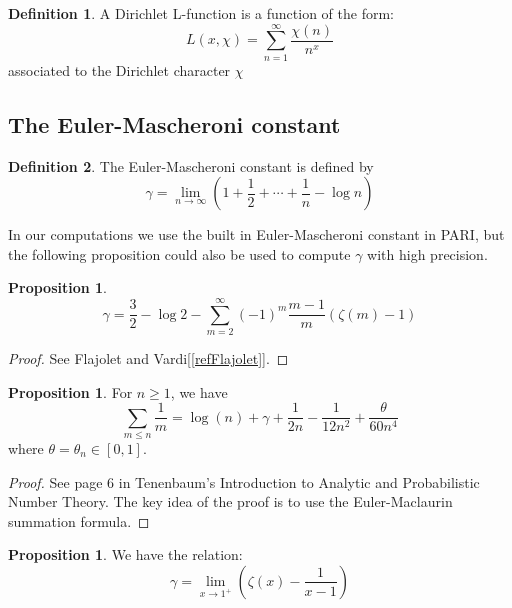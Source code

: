 \documentclass{article}
\theoremstyle{definition}
\newtheorem{definition}{Definition}[section]
\newtheorem{proposition}[theorem]{Proposition}
\theoremstyle{remark}
\begin{document}
\begin{definition}
A Dirichlet L-function is a function of the form:
$$L(x,\chi) = \sum_{n=1}^{\infty}\frac{\chi(n)}{n^x}$$
associated to the Dirichlet character $\chi$
\end{definition}

\subsection{The Euler-Mascheroni constant}
\begin{definition}
The Euler-Mascheroni constant is defined by
$$\gamma = \lim_{n \rightarrow \infty} \left( 1 + \frac{1}{2} + \cdots + \frac{1}{n} - \log n \right)$$
\end{definition}
In our computations we use the built in Euler-Mascheroni constant in PARI, but the following proposition could also be used to compute $\gamma$ with high precision.
\begin{proposition}
$$\gamma = \frac{3}{2}-\log2-\sum_{m=2}^{\infty}(-1)^m\frac{m-1}{m}(\zeta(m)-1) $$
\end{proposition}
\begin{proof}
See Flajolet and Vardi[\ref{refFlajolet}].
\end{proof}
\begin{proposition}\label{Tenenbaum 0.5}
For $n \geq 1$, we have
$$\sum_{m\leq n}\frac{1}{m}= \log(n) + \gamma + \frac{1}{2n}-\frac{1}{12n^2}+\frac{\theta}{60n^4}$$
where $\theta=\theta_n \in [0,1]$.
\end{proposition}
\begin{proof}
See page 6 in Tenenbaum's Introduction to Analytic and Probabilistic Number Theory. The key idea of the proof is to use the Euler-Maclaurin summation formula.
\end{proof}

\begin{proposition}\label{gammaSondow}
We have the relation:
$$\gamma = \lim_{x \rightarrow 1^+} \left( \zeta(x) - \frac{1}{x-1} \right)$$
\end{proposition}
\end{document}
